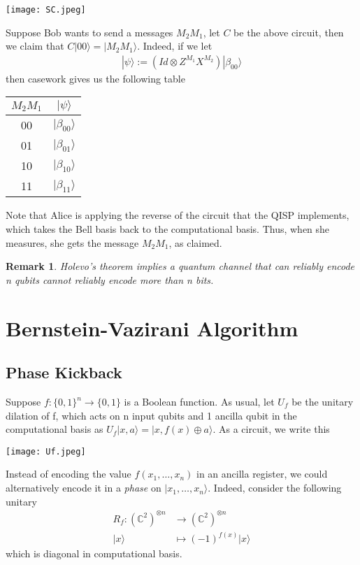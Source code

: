 \documentclass{article}
\newtheorem*{remark}{Remark}
\newcommand{\ket}[1]{|#1\rangle}
\newcommand{\bbC}{\mathbb{C}}
\begin{document}
\begin{center}
    \texttt{[image: SC.jpeg]}
\end{center}

Suppose Bob wants to send a messages $M_2 M_1$, let $C$ be the above circuit, then we claim that $C\ket{00}=\ket{M_2 M_1}$. Indeed, if we let
\begin{align*}
\ket{\psi} :=  (Id \otimes Z^{M_1}X^{M_2})\ket{\beta_{00}}
\end{align*}
then casework gives us the following table
\begin{center}
\begin{tabular}{|c | c|} 
 \hline
 $M_2 M_1$ & $\ket{\psi}$ \\
 \hline
 00 & $\ket{\beta_{00}}$  \\ 
 \hline
 01 & $\ket{\beta_{01}}$  \\
 \hline
 10 & $\ket{\beta_{10}}$ \\
 \hline
 11 & $\ket{\beta_{11}}$ \\
 \hline
\end{tabular}
\end{center}
Note that Alice is applying the reverse of the circuit that the QISP implements, which takes the Bell basis back to the computational basis.  Thus, when she measures, she gets the message $M_2M_1$, as claimed.

\begin{remark}
    Holevo's theorem implies a quantum channel that can reliably encode n qubits cannot reliably encode more than n bits.
\end{remark}
\section{Bernstein-Vazirani Algorithm}

\subsection{Phase Kickback}
Suppose $f: \{0,1\}^n \longrightarrow \{0,1\}$ is a Boolean function. As usual, let $U_f$ be the unitary dilation of f, which acts on n input qubits and 1 ancilla qubit in the computational basis as $U_f \ket{x,a}=\ket{x,f(x)\oplus a}$.  As a circuit, we write this

\begin{center}
    \texttt{[image: Uf.jpeg]}
\end{center}

Instead of encoding the value $f(x_1,\dots,x_n)$ in an ancilla register, we could alternatively encode it in a \emph{phase} on $\ket{x_1,\dots,x_n}$.  
Indeed, consider the following unitary
\begin{align*}
    R_f: (\bbC^2)^{\otimes n} &\longrightarrow (\bbC^2)^{\otimes n}\\
    \ket{x} &\longmapsto (-1)^{f(x)} \ket{x}
\end{align*}
which is diagonal in computational basis.
\end{document}
